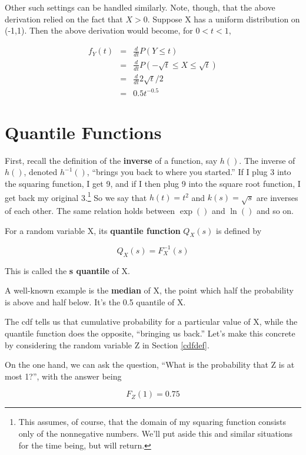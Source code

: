 Other such settings can be handled similarly.  Note, though, that the
above derivation relied on the fact that $X > 0$.  Suppose X has a
uniform distribution on (-1,1).  Then the above derivation would become,
for $0 < t < 1$,

\begin{eqnarray}
f_Y(t) &=& \frac{d}{dt} P(Y \leq t) \\
&=& \frac{d}{dt} P(-\sqrt{t} \leq X \leq \sqrt{t}) \\
&=& \frac{d}{dt} 2 \sqrt{t} / 2 \\
&=& 0.5 t^{-0.5}
\end{eqnarray}

\section{Quantile Functions}

First, recall the definition of the {\bf inverse} of a function, say
$h()$.  The inverse of $h()$, denoted $h^{-1}()$, ``brings you back to
where you started.'' If I plug 3 into the squaring function, I get 9,
and if I then plug 9 into the square root function, I get back my
original 3.\footnote{This assumes, of course, that the domain of my
squaring function consists only of the nonnegative numbers.  We'll put
aside this and similar situations for the time being, but will return.}
So we say that $h(t) = t^2$ and $k(s) = \sqrt{s}$ are inverses of each
other.  The same relation holds between $\exp()$ and $\ln()$ and so on.

For a random variable X, its {\bf quantile function} $Q_X(s)$ is defined
by

\begin{equation}
Q_X(s) = F_X^{-1}(s)
\end{equation}

This is called the {\bf s quantile} of X.

A well-known example is the {\bf median} of X, the point which half
the probability is above and half below.  It's the 0.5 quantile of X.

The cdf tells us that cumulative probability for a particular value of
X, while the quantile function does the opposite, ``bringing us back.''
Let's make this concrete by considering the random variable Z in Section
\ref{cdfdef}.

On the one hand, we can ask the question, ``What is the probability that
Z is at most 1?'', with the answer being

\begin{equation}
F_Z(1) = 0.75 
\end{equation}

